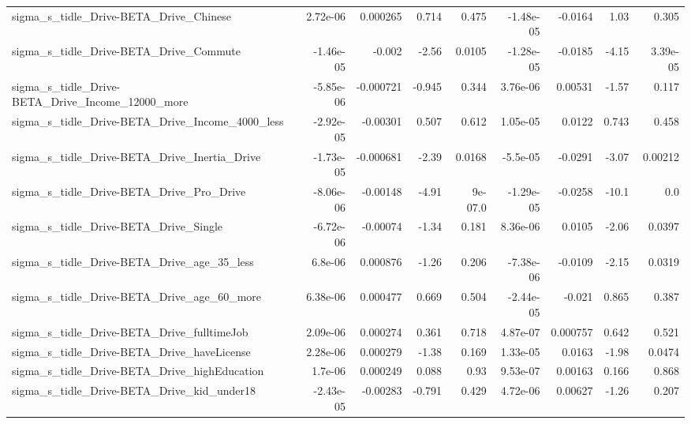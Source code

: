 \begin{tabular}{lrrrrrrrr}
sigma\_s\_tidle\_Drive-BETA\_Drive\_Chinese             &    2.72e-06 &     0.000265 &    0.714 &    0.475 &  -1.48e-05 &     -0.0164 &         1.03 &         0.305 \\
sigma\_s\_tidle\_Drive-BETA\_Drive\_Commute             &   -1.46e-05 &       -0.002 &    -2.56 &   0.0105 &  -1.28e-05 &     -0.0185 &        -4.15 &      3.39e-05 \\
sigma\_s\_tidle\_Drive-BETA\_Drive\_Income\_12000\_more   &   -5.85e-06 &    -0.000721 &   -0.945 &    0.344 &   3.76e-06 &     0.00531 &        -1.57 &         0.117 \\
sigma\_s\_tidle\_Drive-BETA\_Drive\_Income\_4000\_less    &   -2.92e-05 &     -0.00301 &    0.507 &    0.612 &   1.05e-05 &      0.0122 &        0.743 &         0.458 \\
sigma\_s\_tidle\_Drive-BETA\_Drive\_Inertia\_Drive       &   -1.73e-05 &    -0.000681 &    -2.39 &   0.0168 &   -5.5e-05 &     -0.0291 &        -3.07 &       0.00212 \\
sigma\_s\_tidle\_Drive-BETA\_Drive\_Pro\_Drive           &   -8.06e-06 &     -0.00148 &    -4.91 &  9e-07.0 &  -1.29e-05 &     -0.0258 &        -10.1 &           0.0 \\
sigma\_s\_tidle\_Drive-BETA\_Drive\_Single              &   -6.72e-06 &     -0.00074 &    -1.34 &    0.181 &   8.36e-06 &      0.0105 &        -2.06 &        0.0397 \\
sigma\_s\_tidle\_Drive-BETA\_Drive\_age\_35\_less         &     6.8e-06 &     0.000876 &    -1.26 &    0.206 &  -7.38e-06 &     -0.0109 &        -2.15 &        0.0319 \\
sigma\_s\_tidle\_Drive-BETA\_Drive\_age\_60\_more         &    6.38e-06 &     0.000477 &    0.669 &    0.504 &  -2.44e-05 &      -0.021 &        0.865 &         0.387 \\
sigma\_s\_tidle\_Drive-BETA\_Drive\_fulltimeJob         &    2.09e-06 &     0.000274 &    0.361 &    0.718 &   4.87e-07 &    0.000757 &        0.642 &         0.521 \\
sigma\_s\_tidle\_Drive-BETA\_Drive\_haveLicense         &    2.28e-06 &     0.000279 &    -1.38 &    0.169 &   1.33e-05 &      0.0163 &        -1.98 &        0.0474 \\
sigma\_s\_tidle\_Drive-BETA\_Drive\_highEducation       &     1.7e-06 &     0.000249 &    0.088 &     0.93 &   9.53e-07 &     0.00163 &        0.166 &         0.868 \\
sigma\_s\_tidle\_Drive-BETA\_Drive\_kid\_under18         &   -2.43e-05 &     -0.00283 &   -0.791 &    0.429 &   4.72e-06 &     0.00627 &        -1.26 &         0.207 \\

\end{tabular}
